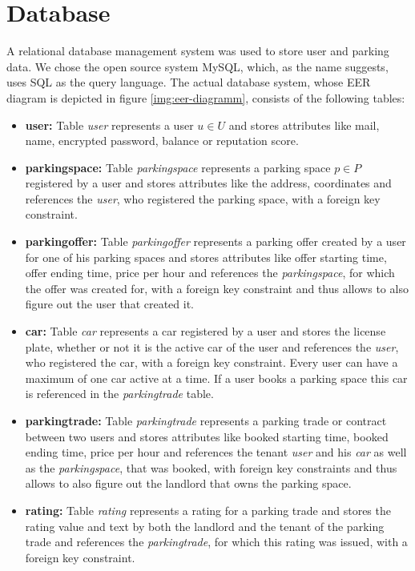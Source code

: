 \section{Database}
A relational database management system was used to store user and parking data. We chose the open source system MySQL, which, as the name suggests, uses SQL as the query language. The actual database system, whose EER diagram is depicted in figure \ref{img:eer-diagramm}, consists of the following tables:
\begin{itemize}
\item \textbf{user:} Table \textit{user} represents a user $u \in U$ and stores attributes like mail, name, encrypted password, balance or reputation score.
\item \textbf{parkingspace:} Table \textit{parkingspace} represents a parking space $p \in P$ registered by a user and stores attributes like the address, coordinates and references the \textit{user}, who registered the parking space, with a foreign key constraint.
\item \textbf{parkingoffer:} Table \textit{parkingoffer} represents a parking offer created by a user for one of his parking spaces and stores attributes like offer starting time, offer ending time, price per hour and references the \textit{parkingspace}, for which the  offer was created for, with a foreign key constraint and thus allows to also figure out the user that created it.
\item \textbf{car:} Table \textit{car} represents a car registered by a user and stores the license plate, whether or not it is the active car of the user and references the \textit{user}, who registered the car, with a foreign key constraint. Every user can have a maximum of one car active at a time. If a user books a parking space this car is referenced in the \textit{parkingtrade} table.
\item \textbf{parkingtrade:} Table \textit{parkingtrade} represents a parking trade or contract between two users and stores attributes like booked starting time, booked ending time, price per hour and references the tenant \textit{user} and his \textit{car} as well as the \textit{parkingspace}, that was booked, with foreign key constraints and thus allows to also figure out the landlord that owns the parking space.
\item \textbf{rating:} Table \textit{rating} represents a rating for a parking trade and stores the rating value and text by both the landlord and the tenant of the parking trade and references the \textit{parkingtrade}, for which this rating was issued, with a foreign key constraint.

\end{itemize}
